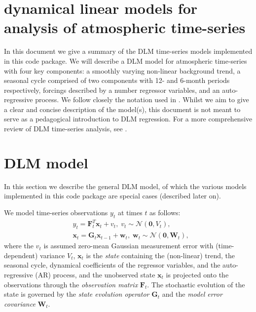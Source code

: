 \documentclass[a4paper, oneside, final]{scrartcl}
\begin{document}
\titleformat{\section}{\center\Large\scshape\raggedright}{}{0em}{}

\section{dynamical linear models for analysis of atmospheric time-series}

In this document we give a summary of the DLM time-series models implemented in this code package. We will describe a DLM model for atmospheric time-series with four key components: a smoothly varying non-linear background trend, a seasonal cycle comprised of two components with 12- and 6-month periods respectively, forcings described by a number regressor variables, and an auto-regressive process. We follow closely the notation used in \citet{laine2014}. Whilst we aim to give a clear and concise description of the model(s), this document is not meant to serve as a pedagogical introduction to DLM regression. For a more comprehensive review of DLM time-series analysis, see \citet{durbinkoopman2012}.

\section{DLM model}
%
In this section we describe the general DLM model, of which the various models implemented in this code package are special cases (described later on). 

We model time-series observations $y_t$ at times $t$ as follows:
\begin{align}
\label{ss}
&y_t = \mathbf{F}_t^T\mathbf{x}_t + v_t,\;v_t\sim\mathcal{N}(\mathbf{0}, V_t), \nonumber \\
&\mathbf{x}_t = \mathbf{G}_{t}\mathbf{x}_{t-1} + \mathbf{w}_t,\;\mathbf{w}_t\sim\mathcal{N}(\mathbf{0}, \mathbf{W}_t),
\end{align}
where the $v_t$ is assumed zero-mean Gaussian measurement error with (time-dependent) variance $V_t$, $\mathbf{x}_t$ is the \emph{state} containing the (non-linear) trend, the seasonal cycle, dynamical coefficients of the regressor variables, and the auto-regressive (AR) process, and the unobserved state $\mathbf{x}_t$ is projected onto the observations through the \emph{observation matrix} $\mathbf{F}_t$. The stochastic evolution of the state is governed by the \emph{state evolution operator} $\mathbf{G}_t$ and the \emph{model error covariance} $\mathbf{W}_t$.
\end{document}
